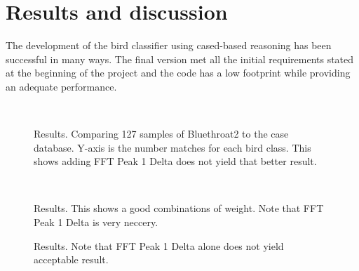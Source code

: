 \section{Results and discussion}
The development of the bird classifier using cased-based reasoning has
been successful in many ways. The final version met all the initial requirements
stated at the beginning of the project and the code has a low footprint while
providing an adequate performance.



\begin{figure}[htp]
    ~
    \caption{Results. Comparing 127 samples of Bluethroat2 to the case database. Y-axis is the number matches for each bird class.
    This shows adding FFT Peak 1 Delta does not yield that better result.}
    \label{fig:results}
\end{figure}

\begin{figure}[htp]

  ~
    \caption{Results. This shows a good combinations of weight. Note that FFT Peak 1 Delta is very neccery.}
    \label{fig:results}
\end{figure}



\begin{figure}[htp]
    \caption{Results. Note that FFT Peak 1 Delta alone does not yield acceptable result.}
    \label{fig:results}
\end{figure}




